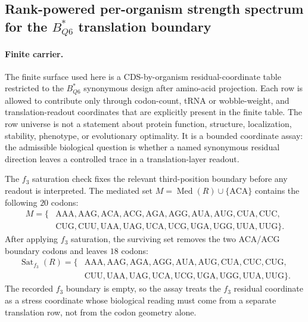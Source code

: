 
\subsection{Rank-powered per-organism strength spectrum for the $B^{\ast}_{Q6}$ translation boundary}
\label{sec:bioreality-q6-axis-strength-spectrum-per-organism}

\paragraph{Finite carrier.}
The finite surface used here is a CDS-by-organism residual-coordinate table restricted to the $B^{\ast}_{Q6}$ synonymous design after amino-acid projection.  Each row is allowed to contribute only through codon-count, tRNA or wobble-weight, and translation-readout coordinates that are explicitly present in the finite table.  The row universe is not a statement about protein function, structure, localization, stability, phenotype, or evolutionary optimality.  It is a bounded coordinate assay: the admissible biological question is whether a named synonymous residual direction leaves a controlled trace in a translation-layer readout.

The $f_3$ saturation check fixes the relevant third-position boundary before any readout is interpreted.  The mediated set $M=\operatorname{Med}(R)\cup\{\mathrm{ACA}\}$ contains the following $20$ codons:
$$
\begin{aligned}
M=\{&\mathrm{AAA},\mathrm{AAG},\mathrm{ACA},\mathrm{ACG},\mathrm{AGA},\mathrm{AGG},\mathrm{AUA},\mathrm{AUG},\mathrm{CUA},\mathrm{CUC},\\
&\mathrm{CUG},\mathrm{CUU},\mathrm{UAA},\mathrm{UAG},\mathrm{UCA},\mathrm{UCG},\mathrm{UGA},\mathrm{UGG},\mathrm{UUA},\mathrm{UUG}\}.
\end{aligned}
$$
After applying $f_3$ saturation, the surviving set removes the two ACA/ACG boundary codons and leaves $18$ codons:
$$
\begin{aligned}
\operatorname{Sat}_{f_3}(R)=\{&\mathrm{AAA},\mathrm{AAG},\mathrm{AGA},\mathrm{AGG},\mathrm{AUA},\mathrm{AUG},\mathrm{CUA},\mathrm{CUC},\mathrm{CUG},\\
&\mathrm{CUU},\mathrm{UAA},\mathrm{UAG},\mathrm{UCA},\mathrm{UCG},\mathrm{UGA},\mathrm{UGG},\mathrm{UUA},\mathrm{UUG}\}.
\end{aligned}
$$
The recorded $f_3$ boundary is empty, so the assay treats the $f_3$ residual coordinate as a stress coordinate whose biological reading must come from a separate translation row, not from the codon geometry alone.

